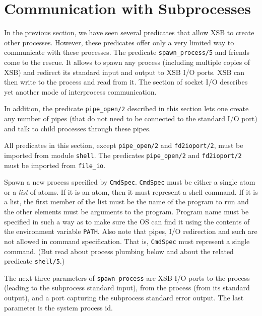 \section{Communication with Subprocesses}

In the previous section, we have seen several predicates that allow XSB to
create other processes. However, these predicates offer only a very limited
way to communicate with these processes. The predicate
\verb|spawn_process/5| and friends come to the rescue. It allows to spawn
any process (including multiple copies of XSB) and redirect its standard
input and output to XSB I/O ports. XSB can then write to the process and
read from it. The section of socket I/O describes yet another mode of
interprocess communication. 

In addition, the predicate {\tt pipe\_open/2} described in this section
lets one create any number of pipes (that do not need to be connected to
the standard I/O port) and talk to child processes through these pipes.

All predicates in this section, except {\tt pipe\_open/2} and
{\tt fd2ioport/2}, must be imported from module {\tt shell}.
The predicates {\tt pipe\_open/2} and
{\tt fd2ioport/2} must be imported from {\tt file\_io}.

\begin{description}
Spawn a new process specified by {\tt CmdSpec}. {\tt CmdSpec} must be
either a single atom or a \emph{list} of atoms.
If it is an atom, then it must represent a shell command.
If it is a list, the first member of the list must be the name of the
program to run and the 
other elements must be arguments to the program. Program name must be specified
in such a way as to make sure the OS can find it using the contents of the
environment variable {\tt PATH}.
Also note that pipes, I/O redirection and such are not allowed in command
specification. That is, {\tt CmdSpec} must represent a single command.
(But read about process plumbing below and about the related predicate
{\tt shell/5}.)

The next three parameters of \verb|spawn_process| are XSB I/O ports
to the process (leading to the subprocess standard input), from the process
(from its standard output), and a port capturing the
subprocess standard error output. The last parameter is the system process id.
\end{description}

